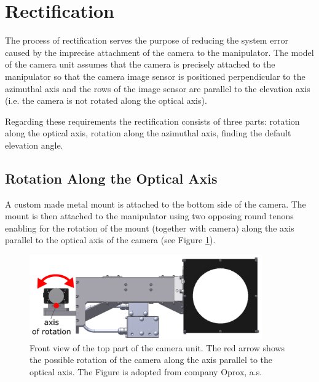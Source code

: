 \section{Rectification} \label{txt:rectification}

The process of rectification serves the purpose of reducing the system error caused by the imprecise attachment of the camera to the manipulator. The model of the camera unit assumes that the camera is precisely attached to the manipulator so that the camera image sensor is positioned perpendicular to the azimuthal axis and the rows of the image sensor are parallel to the elevation axis (i.e. the camera is not rotated along the optical axis).

Regarding these requirements the rectification consists of three parts: rotation along the optical axis, rotation along the azimuthal axis, finding the default elevation angle.


\subsection{Rotation Along the Optical Axis}

A custom made metal mount is attached to the bottom side of the camera. The mount is then attached to the manipulator using two opposing round tenons enabling for the rotation of the mount (together with camera) along the axis parallel to the optical axis of the camera (see Figure \ref{fig:rect_model_front_view}).

\begin{figure}[htb]
	\centering
	\includegraphics[width=10cm]{fig/rect_model_front_view.png}
	\caption{Front view of the top part of the camera unit. The red arrow shows the possible rotation of the camera along the axis parallel to the optical axis. The Figure is adopted from company Oprox, a.s.}
	\label{fig:rect_model_front_view}
\end{figure}

